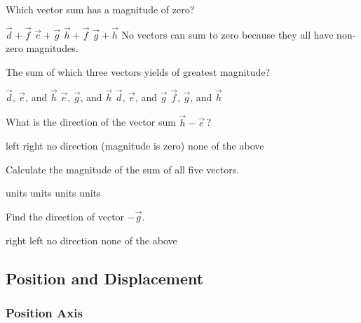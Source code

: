 \documentclass[]{exam}
\begin{document}
\begin{questions}
\question \label{tySbh}
Which vector sum has a magnitude of zero?

\begin{randomizechoices}[keeplast]
    \correctchoice $\vec{d} + \vec{f}$
    \choice $\vec{e} + \vec{g}$
    \choice $\vec{h} + \vec{f}$
    \choice $\vec{g} + \vec{h}$
    \choice No vectors can sum to zero because they all have non-zero magnitudes.
\end{randomizechoices}

\question
The sum of which three vectors yields of greatest magnitude?

\begin{randomizechoices}
    \correctchoice $\vec{d}$, $\vec{e}$, and $\vec{h}$
    \choice $\vec{e}$, $\vec{g}$, and $\vec{h}$
    \choice $\vec{d}$, $\vec{e}$, and $\vec{g}$
    \choice $\vec{f}$, $\vec{g}$, and $\vec{h}$
\end{randomizechoices}

\question
What is the direction of the vector sum $\vec{h} - \vec{e}\,$?

\begin{randomizechoices}[keeplast]
    \correctchoice left
    \choice right
    \choice no direction (magnitude is zero)
    \choice none of the above
\end{randomizechoices}

\question
Calculate the magnitude of the sum of all five vectors.

\begin{randomizechoices}
     units
     units 
     units
     units
\end{randomizechoices}

\question \label{oFwyb}
Find the direction of vector $-\vec{g}$.

\begin{randomizechoices}[keeplast]
    \correctchoice right
    \choice left
    \choice no direction
    \choice none of the above
\end{randomizechoices}


\end{questions}

\clearpage
\subsection{Position and Displacement}

\subsubsection*{Position Axis}
\end{document}
